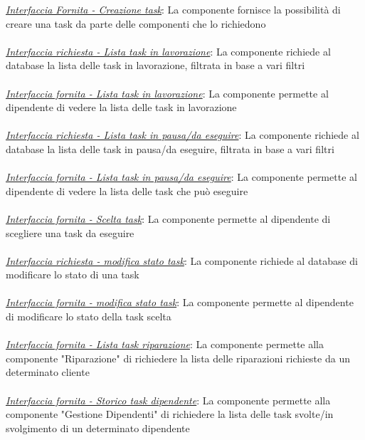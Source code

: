 \documentclass{report}
\begin{document}
\uline{\textit{Interfaccia Fornita - Creazione task}}: 
La componente fornisce la possibilità di creare una task da parte delle componenti che lo richiedono \\\\
\uline{\textit{Interfaccia richiesta - Lista task in lavorazione}}: 
La componente richiede al database la lista delle task in lavorazione, filtrata in base a vari filtri\\\\
\uline{\textit{Interfaccia fornita - Lista task in lavorazione}}: 
La componente permette al dipendente di vedere  la lista delle task in lavorazione\\\\
\uline{\textit{Interfaccia richiesta - Lista task in pausa/da eseguire}}: 
La componente richiede al database la lista delle task in pausa/da eseguire, filtrata in base a vari filtri\\\\
\uline{\textit{Interfaccia fornita - Lista task in pausa/da eseguire}}: 
La componente permette al dipendente di vedere la lista delle task che può eseguire\\\\
\uline{\textit{Interfaccia fornita - Scelta task}}: 
La componente permette al dipendente di scegliere una task da eseguire\\\\
\uline{\textit{Interfaccia richiesta - modifica stato task}}:
 La componente richiede al database di modificare lo stato di una task\\\\
\uline{\textit{Interfaccia fornita - modifica stato task}}: 
La componente permette al dipendente di modificare lo stato della task scelta\\\\
\uline{\textit{Interfaccia fornita - Lista task riparazione}}:
La componente permette alla componente "Riparazione" di richiedere la lista delle riparazioni richieste da un determinato cliente\\\\
\uline{\textit{Interfaccia fornita - Storico task dipendente}}:
La componente permette alla componente "Gestione Dipendenti" di richiedere la lista delle task svolte/in svolgimento di un determinato dipendente
\end{document}
